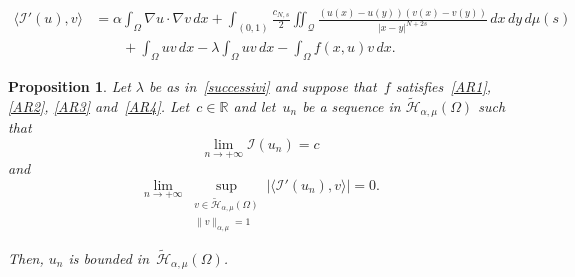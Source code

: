 \documentclass[10pt,a4paper]{amsart}
\newtheorem{proposition}{Proposition}
\def \Q {\mathcal Q}
\def \R {\mathbb{R}}
\begin{document}
\begin{equation}\label{diff2}
\begin{split}
\langle \mathcal I'(u), v\rangle &=\alpha \int_\Omega \nabla u\cdot\nabla v\, dx +\int_{(0, 1)} \frac{c_{N, s}}{2} \iint_{\Q} \frac{(u(x)-u(y))(v(x)-v(y))}{|x-y|^{N+2s}} \,dx\,dy\, d\mu(s)\\
&\qquad+\int_\Omega uv\, dx - \lambda\int_\Omega uv\, dx -\int_\Omega f(x, u) v \, dx.
\end{split}
\end{equation}

\begin{proposition}\label{boundedlinking}
Let $\lambda$ be as in~\eqref{successivi} and suppose that~$f$ satisfies~\eqref{AR1}, \eqref{AR2}, \eqref{AR3} and~\eqref{AR4}. Let~$c\in\R$ and let~$u_n$ be a sequence in $\widetilde{\mathcal{H}}_{\alpha, \mu}(\Omega)$ such that
\begin{equation}\label{bdd12}
\lim_{n\to +\infty} \mathcal I(u_n)=c
\end{equation}
and
\begin{equation}\label{bdd22}
\lim_{n\to +\infty} \sup_{\substack{v\in \widetilde{\mathcal{H}}_{\alpha, \mu}(\Omega)\\ \|v\|_{\alpha, \mu}=1}} |\langle \mathcal I'(u_n), v\rangle| =0.
\end{equation}

Then, $u_n$ is bounded in~$\widetilde{\mathcal{H}}_{\alpha, \mu}(\Omega)$.
\end{proposition}
\end{document}
